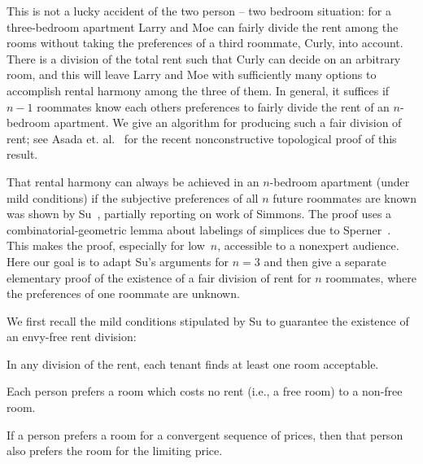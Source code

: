 \documentclass[a4paper,10pt,reqno, english]{amsart}
\theoremstyle{plain}
\theoremstyle{definition}
\begin{document}
This is not a lucky accident of the two person -- two bedroom situation: for a three-bedroom apartment Larry and Moe
can fairly divide the rent among the rooms without taking the preferences of a third roommate, Curly, into account. There is
a division of the total rent such that Curly can decide on an arbitrary room, and this will leave Larry and Moe with
sufficiently many options to accomplish rental harmony among the three of them. In general, it suffices if $n-1$ roommates 
know each others preferences to fairly divide the rent of an $n$-bedroom apartment. We give an algorithm for producing such a fair division of rent; see Asada et. al.~\cite{asada2017} for the recent 
nonconstructive topological proof of this result.

That rental harmony can always be achieved in an $n$-bedroom apartment (under mild conditions) if the subjective 
preferences of all $n$ future roommates are known was shown by Su~\cite{su1999}, partially reporting on work of Simmons.
The proof uses a combinatorial-geometric lemma about labelings of simplices due to Sperner~\cite{sperner1928}. This makes the proof,
especially for low~$n$, accessible to a nonexpert audience. Here our goal is to adapt Su's arguments for $n=3$ and then give a separate elementary proof of the existence of a fair division of rent for $n$ roommates, where the preferences of one roommate are unknown.

We first recall the mild conditions stipulated by Su to guarantee the existence of an envy-free rent division:
\begin{compactenum}[1.]
	\item In any division of the rent, each tenant finds at least one room acceptable.
	\item Each person prefers a room which costs no rent (i.e., a free room) to a non-free room.
	\item If a person prefers a room for a convergent sequence of prices, then that person also prefers the room for the limiting price.
\end{compactenum}
\end{document}
